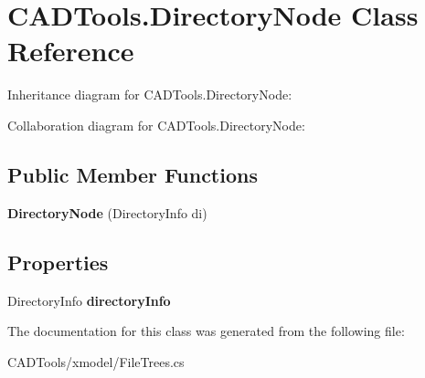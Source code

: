 \hypertarget{class_c_a_d_tools_1_1_directory_node}{}\section{C\+A\+D\+Tools.\+Directory\+Node Class Reference}
\label{class_c_a_d_tools_1_1_directory_node}


Inheritance diagram for C\+A\+D\+Tools.\+Directory\+Node\+:


Collaboration diagram for C\+A\+D\+Tools.\+Directory\+Node\+:
\subsection*{Public Member Functions}
\begin{DoxyCompactItemize}
\item 
\mbox{\label{class_c_a_d_tools_1_1_directory_node_a5d629a36040dc0b7c31630831da63439}} 
{\bfseries Directory\+Node} (Directory\+Info di)
\end{DoxyCompactItemize}
\subsection*{Properties}
\begin{DoxyCompactItemize}
\item 
\mbox{\label{class_c_a_d_tools_1_1_directory_node_a374493802da08ac170324791fb86c661}} 
Directory\+Info {\bfseries directory\+Info}
\end{DoxyCompactItemize}


The documentation for this class was generated from the following file\+:\begin{DoxyCompactItemize}
\item 
C\+A\+D\+Tools/xmodel/File\+Trees.\+cs\end{DoxyCompactItemize}
